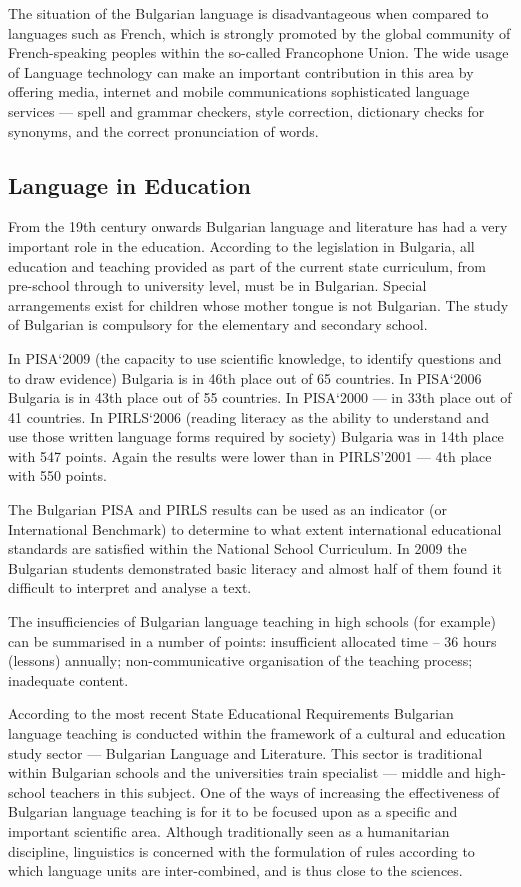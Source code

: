 \documentclass[]{../../metanetpaper}
\begin{document}
\begin{multicols}{2}
The situation of the Bulgarian language is disadvantageous when compared to languages such as French, which is strongly promoted by the global community of French-speaking peoples within the so-called Francophone Union. The wide usage of Language technology can make an important contribution in this area by offering media, internet and mobile communications sophisticated language services — spell and grammar checkers, style correction, dictionary checks for synonyms, and the correct pronunciation of words.

\subsection{Language in Education}

From the 19th century onwards Bulgarian language and literature has had a very important role in the education. According to the legislation in Bulgaria, all education and teaching provided as part of the current state curriculum, from pre-school through to university level, must be in Bulgarian. Special arrangements exist for children whose mother tongue is not Bulgarian. The study of Bulgarian is compulsory for the elementary and secondary school.

In PISA‘2009 \cite{oecd} (the capacity to use scientific knowledge, to identify questions and to draw evidence) Bulgaria is in 46th place out of 65 countries. In PISA‘2006 Bulgaria is in 43th place out of 55 countries. In PISA‘2000 — in 33th place out of 41 countries. 
In PIRLS‘2006 \cite{nces} (reading literacy as the ability to understand and use those written language forms required by society) Bulgaria was in 14th place with 547 points. Again the results were lower than in PIRLS’2001 — 4th place with 550 points.

The Bulgarian PISA and PIRLS results can be used as an indicator (or International Benchmark) to determine to what extent international educational standards are satisfied within the National School Curriculum. In 2009 the Bulgarian students demonstrated basic literacy and almost half of them found it difficult to interpret and analyse a text. 

The insufficiencies of Bulgarian language teaching in high schools (for example) can be summarised in a number of points: insufficient allocated time – 36 hours (lessons) annually; non-communicative organisation of the teaching process; inadequate content.

According to the most recent State Educational Requirements Bulgarian language teaching is conducted within the framework of a cultural and education study sector — Bulgarian Language and Literature. This sector is traditional within Bulgarian schools and the universities train specialist — middle and high-school teachers in this subject. One of the ways of increasing the effectiveness of Bulgarian language teaching is for it to be focused upon as a specific and important scientific area. Although traditionally seen as a humanitarian discipline, linguistics is concerned with the formulation of rules according to which language units are inter-combined, and is thus close to the sciences. 


\end{multicols}
\end{document}
